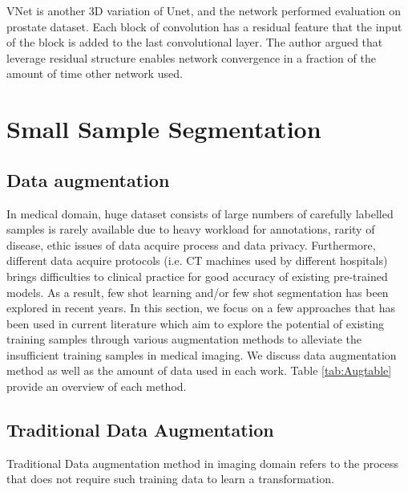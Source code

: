 VNet \cite{milletari_v-net_2016} is another 3D variation of Unet, and the network performed evaluation on prostate dataset. Each block of convolution has a residual feature that the input of the block is added to the last convolutional layer. The author argued that leverage residual structure enables network convergence in a fraction of the amount of time other network used.


\section{Small Sample Segmentation}

\subsection{Data augmentation}
In medical domain, huge dataset consists of large numbers of carefully labelled samples is rarely available due to heavy workload for annotations, rarity of disease, ethic issues of data acquire process and data privacy. Furthermore, different data acquire protocols (i.e. CT machines used by different hospitals) brings difficulties to clinical practice for good accuracy of existing pre-trained models. As a result, few shot learning and/or few shot segmentation has been explored in recent years. 
In this section, we focus on a few approaches that has been used in current literature which aim to explore the potential of existing training samples through various augmentation methods to alleviate the insufficient training samples in medical imaging. We discuss data augmentation method as well as the amount of data used in each work. Table \ref{tab:Augtable} provide an overview of each method.

\subsection{Traditional Data Augmentation}
Traditional Data augmentation method in imaging domain refers to the process that does not require such training data to learn a transformation.\\

